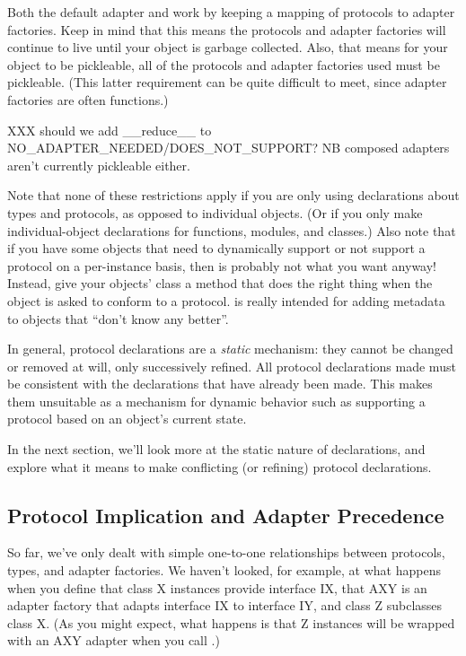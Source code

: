 \begin{verbatim%
}
\begin{verbatim%
}
\begin{verbatim%
}
\begin{verbatim%
}
\begin{verbatim%
}
\begin{verbatim%
}
Both the default adapter and  work by keeping a mapping of
protocols to adapter factories.  Keep in mind that this means the protocols and
adapter factories will continue to live until your object is garbage collected.
Also, that means for your object to be pickleable, all of the protocols and
adapter factories used must be pickleable.  (This latter requirement can be
quite difficult to meet, since adapter factories are often functions.)

XXX should we add __reduce__ to NO_ADAPTER_NEEDED/DOES_NOT_SUPPORT?  NB
composed adapters aren't currently pickleable either.

Note that none of these restrictions apply if you are only using declarations
about types and protocols, as opposed to individual objects.  (Or if you only
make individual-object declarations for functions, modules, and classes.)
Also note that if you have some objects that need to dynamically support or
not support a protocol on a per-instance basis, then 
is probably not what you want anyway!  Instead, give your objects' class a
 method that does the right thing when the object is
asked to conform to a protocol.   is really intended
for adding metadata to objects that ``don't know any better''.

In general, protocol declarations are a \emph{static} mechanism: they cannot be
changed or removed at will, only successively refined.  All protocol
declarations made must be consistent with the declarations that have already
been made.  This makes them unsuitable as a mechanism for dynamic behavior such
as supporting a protocol based on an object's current state.

In the next section, we'll look more at the static nature of declarations,
and explore what it means to make conflicting (or refining) protocol
declarations.












\subsection{Protocol Implication and Adapter Precedence \label{proto-implication}}

So far, we've only dealt with simple one-to-one relationships between
protocols, types, and adapter factories.  We haven't looked, for example, at
what happens when you define that class X instances provide interface IX,
that AXY is an adapter factory that adapts interface IX to interface IY, and
class Z subclasses class X.  (As you might expect, what happens is that Z
instances will be wrapped with an AXY adapter when you call
.)


\end{verbatim%
}
\end{verbatim%
}
\end{verbatim%
}
\end{verbatim%
}
\end{verbatim%
}
\end{verbatim%
}
